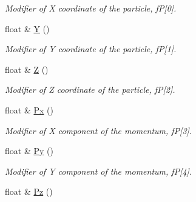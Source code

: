 \begin{DoxyCompactItemize}
\begin{DoxyCompactList}\small\item\em Modifier of X coordinate of the particle, fP\mbox{[}0\mbox{]}. \end{DoxyCompactList}\item 
float \& \hyperlink{classKFParticleBase_a1c29a8d9e7169c0b2804f0b847b46fec}{Y} ()\hypertarget{classKFParticleBase_a1c29a8d9e7169c0b2804f0b847b46fec}{}\label{classKFParticleBase_a1c29a8d9e7169c0b2804f0b847b46fec}

\begin{DoxyCompactList}\small\item\em Modifier of Y coordinate of the particle, fP\mbox{[}1\mbox{]}. \end{DoxyCompactList}\item 
float \& \hyperlink{classKFParticleBase_a2490e97a727d18d3f1ab74b2b76a796d}{Z} ()\hypertarget{classKFParticleBase_a2490e97a727d18d3f1ab74b2b76a796d}{}\label{classKFParticleBase_a2490e97a727d18d3f1ab74b2b76a796d}

\begin{DoxyCompactList}\small\item\em Modifier of Z coordinate of the particle, fP\mbox{[}2\mbox{]}. \end{DoxyCompactList}\item 
float \& \hyperlink{classKFParticleBase_af1e53bb77cab9d0273de91753c78010d}{Px} ()\hypertarget{classKFParticleBase_af1e53bb77cab9d0273de91753c78010d}{}\label{classKFParticleBase_af1e53bb77cab9d0273de91753c78010d}

\begin{DoxyCompactList}\small\item\em Modifier of X component of the momentum, fP\mbox{[}3\mbox{]}. \end{DoxyCompactList}\item 
float \& \hyperlink{classKFParticleBase_aec8b69726b2d16361a298744da70f980}{Py} ()\hypertarget{classKFParticleBase_aec8b69726b2d16361a298744da70f980}{}\label{classKFParticleBase_aec8b69726b2d16361a298744da70f980}

\begin{DoxyCompactList}\small\item\em Modifier of Y component of the momentum, fP\mbox{[}4\mbox{]}. \end{DoxyCompactList}\item 
float \& \hyperlink{classKFParticleBase_ab5d8ea3ef595ed1bbcc997c52573d9c5}{Pz} ()\hypertarget{classKFParticleBase_ab5d8ea3ef595ed1bbcc997c52573d9c5}{}\label{classKFParticleBase_ab5d8ea3ef595ed1bbcc997c52573d9c5}


\end{DoxyCompactItemize}
